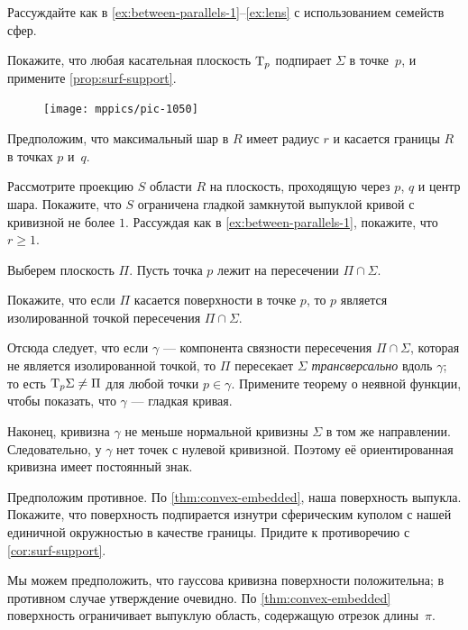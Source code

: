 \begin{multicols}{2}
Рассуждайте как в \ref{ex:between-parallels-1}--\ref{ex:lens} с использованием семейств сфер.

Покажите, что любая касательная плоскость $\mathrm{T}_p$ подпирает $\Sigma$ в точке~$p$,
и примените \ref{prop:surf-support}.


{

\begin{figure}
\vskip-6mm
\centering
\texttt{[image: mppics/pic-1050]}
\vskip-0mm
\end{figure}

Предположим, что максимальный шар в $R$ имеет радиус $r$ и касается границы $R$ в точках $p$ и~$q$.

Рассмотрите проекцию $S$ области $R$ на плоскость, проходящую через $p$, $q$ и центр шара.
Покажите, что $S$ ограничена гладкой замкнутой выпуклой кривой с кривизной не более $1$.
Рассуждая как в \ref{ex:between-parallels-1}, покажите, что $r\ge 1$.

}

Выберем плоскость $\Pi$.
Пусть точка $p$ лежит на пересечении $\Pi\cap\Sigma$.

Покажите, что если $\Pi$ касается поверхности в точке $p$, то $p$ является изолированной точкой пересечения $\Pi\cap\Sigma$.

Отсюда следует, что если $\gamma$ --- компонента связности пересечения $\Pi\cap\Sigma$, которая не является изолированной точкой, то $\Pi$ пересекает $\Sigma$ \emph{трансверсально} вдоль $\gamma$; то есть $\mathrm{T}_p\Sigma\ne\Pi$ для любой точки $p \in \gamma$. Примените теорему о неявной функции, чтобы показать, что $\gamma$ --- гладкая кривая.

Наконец, кривизна $\gamma$ не меньше нормальной кривизны $\Sigma$ в том же направлении.
Следовательно, у $\gamma$ нет точек с нулевой кривизной.
Поэтому её ориентированная кривизна имеет постоянный знак.

Предположим противное.
По \ref{thm:convex-embedded}, наша поверхность выпукла.
Покажите, что поверхность подпирается изнутри сферическим куполом с нашей единичной окружностью в качестве границы.
Придите к противоречию с \ref{cor:surf-support}.

Мы можем предположить, что гауссова кривизна поверхности положительна; в противном случае утверждение очевидно.
По \ref{thm:convex-embedded} поверхность ограничивает выпуклую область, содержащую отрезок длины~$\pi$.


\end{multicols}
